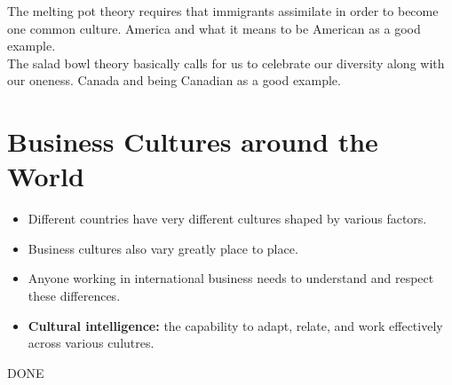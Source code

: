 The melting pot theory requires that immigrants assimilate in order to become one common culture. America and what it means to be American as a good example. \\ 

The salad bowl theory basically calls for us to celebrate our diversity along with our oneness. Canada and being Canadian as a good example.

\section{Business Cultures around the World}

\begin{itemize}
    \item Different countries have very different cultures shaped by various factors.
    \item Business cultures also vary greatly place to place.
    \item Anyone working in international business needs to understand and respect these differences.
    \item \textbf{Cultural intelligence:} the capability to adapt, relate, and work effectively across various culutres. 
\end{itemize}

DONE